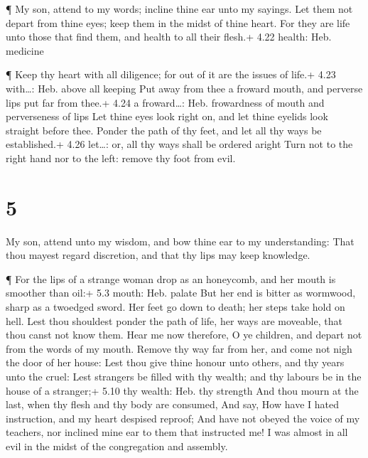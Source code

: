  ¶ My son, attend to my words; incline thine ear unto my
sayings.  Let them not depart from thine eyes; keep them in
the midst of thine heart.  For they are life unto those
that find them, and health to all their flesh.+ 4.22 health: Heb.
medicine

 ¶ Keep thy heart with all diligence; for out of it are the
issues of life.+ 4.23 with\ldots: Heb. above all keeping 
Put away from thee a froward mouth, and perverse lips put far from
thee.+ 4.24 a froward\ldots: Heb. frowardness of mouth and perverseness
of lips  Let thine eyes look right on, and let thine
eyelids look straight before thee.  Ponder the path of thy
feet, and let all thy ways be established.+ 4.26 let\ldots: or, all thy
ways shall be ordered aright  Turn not to the right hand
nor to the left: remove thy foot from evil.

\hypertarget{section-4}{%
\section{5}\label{section-4}}

 My son, attend unto my wisdom, and bow thine ear to my
understanding:  That thou mayest regard discretion, and that
thy lips may keep knowledge.

 ¶ For the lips of a strange woman drop as an honeycomb, and
her mouth is smoother than oil:+ 5.3 mouth: Heb. palate  But
her end is bitter as wormwood, sharp as a twoedged sword. 
Her feet go down to death; her steps take hold on hell. 
Lest thou shouldest ponder the path of life, her ways are moveable, that
thou canst not know them.  Hear me now therefore, O ye
children, and depart not from the words of my mouth.  Remove
thy way far from her, and come not nigh the door of her house:
 Lest thou give thine honour unto others, and thy years unto
the cruel:  Lest strangers be filled with thy wealth; and
thy labours be in the house of a stranger;+ 5.10 thy wealth: Heb. thy
strength  And thou mourn at the last, when thy flesh and
thy body are consumed,  And say, How have I hated
instruction, and my heart despised reproof;  And have not
obeyed the voice of my teachers, nor inclined mine ear to them that
instructed me!  I was almost in all evil in the midst of
the congregation and assembly.

